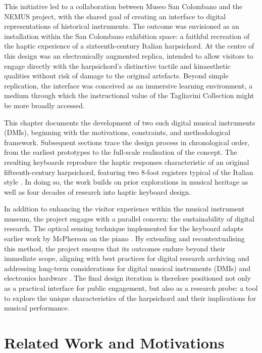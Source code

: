 This initiative led to a collaboration between Museo San Colombano and the NEMUS
project, with the shared goal of creating an interface to digital representations
of historical instruments. The outcome was envisioned as an installation within
the San Colombano exhibition space: a faithful recreation of the haptic
experience of a sixteenth-century Italian harpsichord. At the centre of this
design was an electronically augmented replica, intended to allow visitors to
engage directly with the harpsichord’s distinctive tactile and kinaesthetic
qualities without risk of damage to the original artefacts. Beyond simple
replication, the interface was conceived as an immersive learning environment,
a medium through which the instructional value of the Tagliavini Collection
might be more broadly accessed.  

This chapter documents the development of two such digital musical instruments
(DMIs), beginning with the motivations, constraints, and methodological
framework. Subsequent sections trace the design process in chronological order,
from the earliest prototypes to the full-scale realisation of the concept. The
resulting keyboards reproduce the haptic responses characteristic of an
original fifteenth-century harpsichord, featuring two 8-foot registers typical
of the Italian style \cite{tagliavini_clavicembali_1987}. In doing so, the work
builds on prior explorations in musical heritage
\cite{mcalpine_sampling_2014,baldwin_tromba_2016} as well as four decades of
research into haptic keyboard design.  

In addition to enhancing the visitor experience within the musical instrument
museum, the project engages with a parallel concern: the sustainability of
digital research. The optical sensing technique implemented for the keyboard
adapts earlier work by McPherson on the piano
\cite{mcpherson_portable_2013}. By extending and recontextualising this method,
the project ensures that its outcomes endure beyond their immediate scope,
aligning with best practices for digital research archiving
\cite{smith_software_2016} and addressing long-term considerations for digital
musical instruments (DMIs) and electronics hardware
\cite{mcpherson_nimehub_2016,fiordelmondo_longevity_2024}. The final design
iteration is therefore positioned not only as a practical interface for public
engagement, but also as a research probe: a tool to explore the unique
characteristics of the harpsichord and their implications for musical
performance.  


\section{Related Work and Motivations}\label{related-work}

